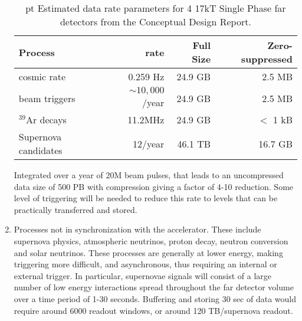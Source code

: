 \begin{enumerate}
\begin{table}[htp]
\begin{center}
\begin{tabular}{|l|r|r|r|}
\hline
Process&rate&Full Size&Zero-suppressed\\
\hline
cosmic rate&0.259 Hz&24.9 GB&2.5 MB\\
beam triggers&$\sim 10,000$/year&24.9 GB&2.5 MB\\
$^{39}$Ar decays&11.2MHz&24.9 GB&$<$ 1 kB\\
Supernova candidates &12/year&46.1 TB&16.7 GB\\
\hline
\end{tabular}
\end{center}
\caption{\normalsize {} pt Estimated data rate parameters for 4 17kT Single Phase far detectors from the Conceptual Design Report. }
\label{sw:bigone}
\end{table}%



Integrated over a year of 20M beam pulses, that leads to an uncompressed data size of 500 PB with compression giving a factor of 4-10 reduction. Some level of triggering will be needed to reduce this rate to levels that can be practically transferred and stored.




\item Processes not in synchronization with the accelerator.  These include supernova physics, atmospheric neutrinos, proton decay, neutron conversion and solar neutrinos.  These processes are generally at lower energy, making triggering more difficult, and asynchronous, thus requiring an internal or external trigger.  In particular, supernovae signals will consist of a large number of low energy interactions spread throughout the far detector volume over a time period of 1-30 seconds. Buffering and storing 30 sec of data would require around 6000 readout windows, or around 120 TB/supernova readout.  




\end{enumerate}
